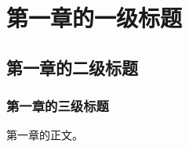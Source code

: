 \section{第一章的一级标题}
\subsection{第一章的二级标题}
\subsubsection{第一章的三级标题}
第一章的正文。
\cite{huangResearchU2019}	%